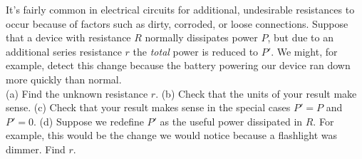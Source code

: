 It's fairly common in electrical circuits for additional, undesirable resistances to occur
because of factors such as dirty, corroded, or loose connections. Suppose that a device
with resistance $R$ normally dissipates power $P$, but due to an additional series resistance $r$
the \emph{total} power is reduced to $P'$. We might, for example, detect this change because
the battery powering our device ran down more quickly than normal. \\
(a) Find the unknown resistance $r$.\answercheck\hwendpart
(b) Check that the units of your result make sense.\hwendpart
(c) Check that your result makes sense in the special cases $P'=P$ and $P'=0$.\hwendpart
(d) Suppose we redefine $P'$ as the useful power dissipated in $R$. For example,
this would be the change we would notice because a flashlight was dimmer. Find $r$.\answercheck

